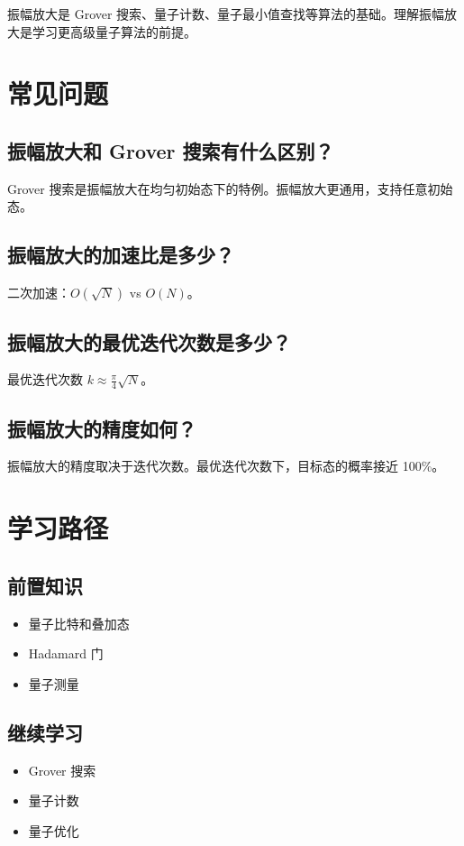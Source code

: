 \documentclass[12pt,a4paper]{article}
\begin{document}
振幅放大是 Grover 搜索、量子计数、量子最小值查找等算法的基础。理解振幅放大是学习更高级量子算法的前提。

\section{常见问题}

\subsection{振幅放大和 Grover 搜索有什么区别？}

Grover 搜索是振幅放大在均匀初始态下的特例。振幅放大更通用，支持任意初始态。

\subsection{振幅放大的加速比是多少？}

二次加速：$O(\sqrt{N})$ vs $O(N)$。

\subsection{振幅放大的最优迭代次数是多少？}

最优迭代次数 $k \approx \frac{\pi}{4} \sqrt{N}$。

\subsection{振幅放大的精度如何？}

振幅放大的精度取决于迭代次数。最优迭代次数下，目标态的概率接近 100\%。

\section{学习路径}

\subsection{前置知识}
\begin{itemize}
  \item 量子比特和叠加态
  \item Hadamard 门
  \item 量子测量
\end{itemize}

\subsection{继续学习}
\begin{itemize}
  \item Grover 搜索
  \item 量子计数
  \item 量子优化
\end{itemize}
\end{document}
